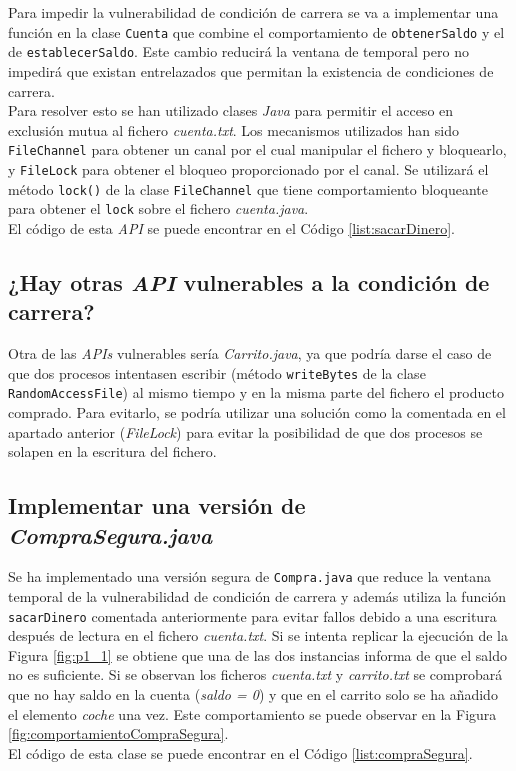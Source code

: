 \documentclass{article}
\begin{document}
Para impedir la vulnerabilidad de condición de carrera se va a implementar una función en la clase \texttt{Cuenta} que combine el comportamiento de \texttt{obtenerSaldo} y el de \texttt{establecerSaldo}. Este cambio reducirá la ventana de temporal pero no impedirá que existan entrelazados que permitan la existencia de condiciones de carrera.\\
Para resolver esto se han utilizado clases \textit{Java} para permitir el acceso en exclusión mutua al fichero \textit{cuenta.txt}. Los mecanismos utilizados han sido \texttt{FileChannel} para obtener un canal por el cual manipular el fichero y bloquearlo, y \texttt{FileLock} para obtener el bloqueo proporcionado por el canal. Se utilizará el método \texttt{lock()} de la clase \texttt{FileChannel} que tiene comportamiento bloqueante para obtener el \texttt{lock} sobre el fichero \textit{cuenta.java}.\\
El código de esta \textit{API} se puede encontrar en el Código \ref{list:sacarDinero}.\\


\subsection{¿Hay otras \textit{API} vulnerables a la condición de carrera?}

Otra de las \textit{APIs} vulnerables sería \textit{Carrito.java}, ya que podría darse el caso de que dos procesos intentasen escribir (método \texttt{writeBytes} de la clase \texttt{RandomAccessFile}) al mismo tiempo y en la misma parte del fichero el producto comprado. Para evitarlo, se podría utilizar una solución como la comentada en el apartado anterior (\textit{FileLock}) para evitar la posibilidad de que dos procesos se solapen en la escritura del fichero.\\


\subsection{Implementar una versión de \textit{CompraSegura.java}}

Se ha implementado una versión segura de \texttt{Compra.java} que reduce la ventana temporal de la vulnerabilidad de condición de carrera y además utiliza la función \texttt{sacarDinero} comentada anteriormente para evitar fallos debido a una escritura después de lectura en el fichero \textit{cuenta.txt}. Si se intenta replicar la ejecución de la Figura \ref{fig:p1_1} se obtiene que una de las dos instancias informa de que el saldo no es suficiente. Si se observan los ficheros \textit{cuenta.txt} y \textit{carrito.txt} se comprobará que no hay saldo en la cuenta (\textit{saldo = 0}) y que en el carrito solo se ha añadido el elemento \textit{coche} una vez. Este comportamiento se puede observar en la Figura \ref{fig:comportamientoCompraSegura}.\\
El código de esta clase se puede encontrar en el Código \ref{list:compraSegura}.\\
\end{document}
